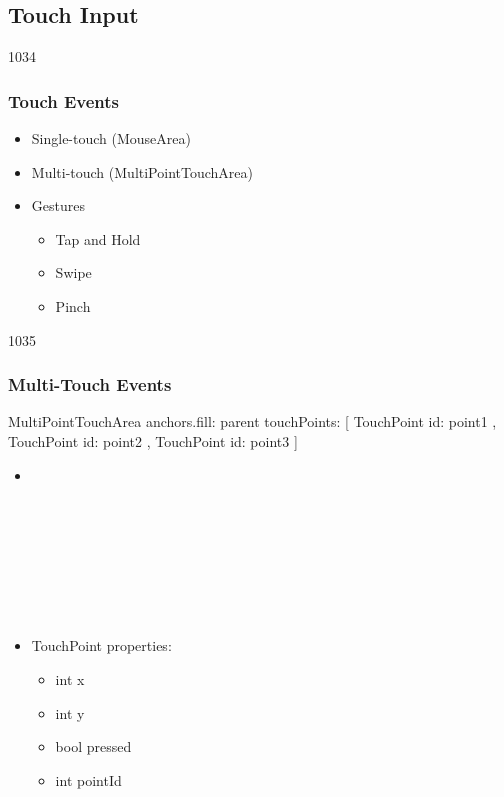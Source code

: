 \subsection{Touch Input}
\begin{slide}{1034}\frametitle{Touch Events}

\begin{itemize}
\item Single-touch (MouseArea)
\item Multi-touch (MultiPointTouchArea)
\item Gestures
  \begin{itemize}
  \item Tap and Hold
  \item Swipe
  \item Pinch
  \end{itemize}
\end{itemize}

\end{slide}

\begin{slide}[fragile]{1035}\frametitle{Multi-Touch Events}

\begin{EXCLUDE}
MultiPointTouchArea {
  anchors.fill: parent
  touchPoints: [
      TouchPoint { id: point1 },
      TouchPoint { id: point2 },
      TouchPoint { id: point3 }
  ]
}
\end{EXCLUDE}

\begin{itemize}
\item[]
\begin{qml}
\\
\\
\qtt{~~\qc{type}{touchPoints}:~[}\\
\\
\\
\\
\qtt{~~]}\\
\qtt{\}}\\
\end{qml}\bigskip
\item[] TouchPoint properties:
  \begin{itemize}
  \item int x
  \item int y
  \item bool pressed
  \item int pointId
  \end{itemize}
\end{itemize}
\end{slide}

